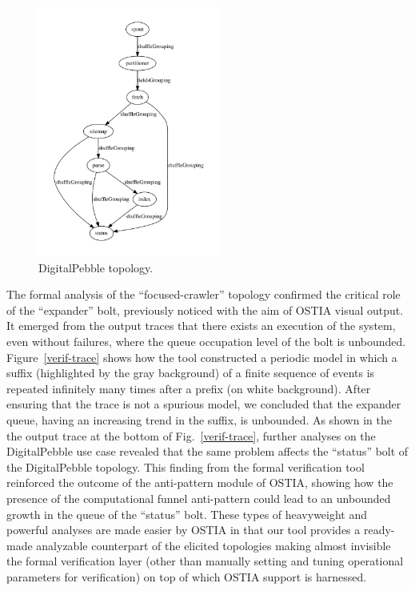 \begin{figure}
\begin{center}
\includegraphics[width=6cm]{images/output/crawl}
		\caption{DigitalPebble topology.}
		\label{dp}
		\end{center}
\end{figure}
The formal analysis of the ``focused-crawler'' topology confirmed the critical role of the ``expander'' bolt, previously noticed with the aim of OSTIA visual output. It emerged from the output traces that there exists an execution of the system, even without failures, where the queue occupation level of the bolt is unbounded. Figure~\ref{verif-trace} shows how the tool constructed a periodic model in which a suffix (highlighted by the gray background) of a finite sequence of events is repeated infinitely many times after a prefix (on white background). After ensuring that the trace is not a spurious model, we concluded that the expander queue, having an increasing trend in the suffix, is unbounded. 
As shown in the the output trace at the bottom of Fig.~\ref{verif-trace}, further analyses on the DigitalPebble use case revealed that the same problem affects the ``status'' bolt of the DigitalPebble topology. This finding from the formal verification tool reinforced the outcome of the anti-pattern module of OSTIA, showing how the presence of the computational funnel anti-pattern could lead to an unbounded growth in the queue of the ``status'' bolt.
These types of heavyweight and powerful analyses are made easier by OSTIA in that our tool provides a ready-made analyzable counterpart of the elicited topologies making almost invisible the formal verification layer (other than manually setting and tuning operational parameters for verification) on top of which OSTIA support is harnessed.
%


